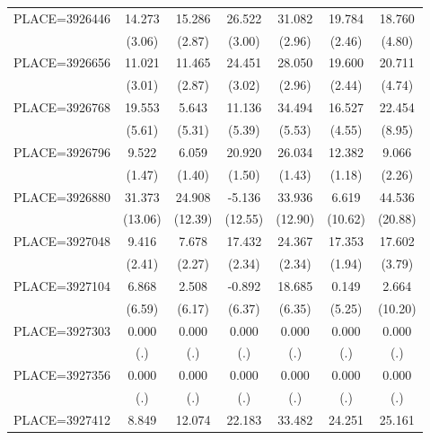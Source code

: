 {\begin{tabular}{l*{6}{c}}
PLACE=3926446       &      14.273&      15.286&      26.522&      31.082&      19.784&      18.760\\
                    &      (3.06)&      (2.87)&      (3.00)&      (2.96)&      (2.46)&      (4.80)\\
PLACE=3926656       &      11.021&      11.465&      24.451&      28.050&      19.600&      20.711\\
                    &      (3.01)&      (2.87)&      (3.02)&      (2.96)&      (2.44)&      (4.74)\\
PLACE=3926768       &      19.553&       5.643&      11.136&      34.494&      16.527&      22.454\\
                    &      (5.61)&      (5.31)&      (5.39)&      (5.53)&      (4.55)&      (8.95)\\
PLACE=3926796       &       9.522&       6.059&      20.920&      26.034&      12.382&       9.066\\
                    &      (1.47)&      (1.40)&      (1.50)&      (1.43)&      (1.18)&      (2.26)\\
PLACE=3926880       &      31.373&      24.908&      -5.136&      33.936&       6.619&      44.536\\
                    &     (13.06)&     (12.39)&     (12.55)&     (12.90)&     (10.62)&     (20.88)\\
PLACE=3927048       &       9.416&       7.678&      17.432&      24.367&      17.353&      17.602\\
                    &      (2.41)&      (2.27)&      (2.34)&      (2.34)&      (1.94)&      (3.79)\\
PLACE=3927104       &       6.868&       2.508&      -0.892&      18.685&       0.149&       2.664\\
                    &      (6.59)&      (6.17)&      (6.37)&      (6.35)&      (5.25)&     (10.20)\\
PLACE=3927303       &       0.000&       0.000&       0.000&       0.000&       0.000&       0.000\\
                    &         (.)&         (.)&         (.)&         (.)&         (.)&         (.)\\
PLACE=3927356       &       0.000&       0.000&       0.000&       0.000&       0.000&       0.000\\
                    &         (.)&         (.)&         (.)&         (.)&         (.)&         (.)\\
PLACE=3927412       &       8.849&      12.074&      22.183&      33.482&      24.251&      25.161\\

\end{tabular}}
